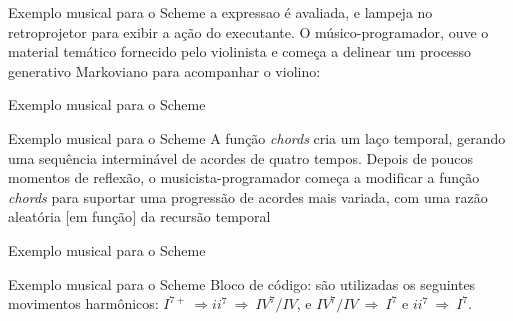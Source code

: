 \documentclass[aspectratio=169]{beamer}
\begin{document}
\begin{frame}{Exemplo musical para o Scheme}
a expressao é avaliada, e lampeja no retroprojetor para exibir a ação do executante. O músico-programador, ouve o material temático fornecido pelo violinista e começa a delinear um processo generativo Markoviano para acompanhar o violino:
\end{frame}

\begin{frame}{Exemplo musical para o Scheme}
\schemedois
\end{frame}




\begin{frame}{Exemplo musical para o Scheme}
A função \emph{chords} cria um laço temporal, gerando uma sequência interminável de acordes de quatro tempos. Depois de poucos momentos de reflexão, o musicista-programador começa a modificar a função \emph{chords} para suportar uma progressão de acordes mais variada, com uma razão aleatória $[$em função$]$ da recursão temporal
\end{frame} 

\begin{frame}{Exemplo musical para o Scheme}
\schemetres
\end{frame}

\begin{frame}{Exemplo musical para o Scheme}
Bloco de código: são utilizadas os seguintes movimentos harmônicos: $I^{7+}~\Rightarrow ii^{7}~\Rightarrow~IV^{7}/IV$, e $IV^{7}/IV~\Rightarrow~I^{7}$ e $ii^{7}~\Rightarrow~I^{7}$.
\end{frame}
\end{document}
